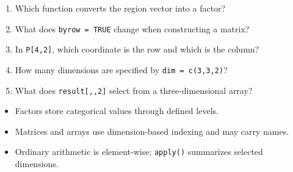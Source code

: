 \begin{quickcheck}
\begin{enumerate}
  \item Which function converts the region vector into a factor?
  \item What does \texttt{byrow = TRUE} change when constructing a matrix?
  \item In \texttt{P[4,2]}, which coordinate is the row and which is the column?
  \item How many dimensions are specified by \texttt{dim = c(3,3,2)}?
  \item What does \texttt{result[,,2]} select from a three-dimensional array?
\end{enumerate}
\end{quickcheck}

\begin{chapterrecap}
\begin{itemize}
  \item Factors store categorical values through defined levels.
  \item Matrices and arrays use dimension-based indexing and may carry names.
  \item Ordinary arithmetic is element-wise; \texttt{apply()} summarizes selected dimensions.
\end{itemize}
\end{chapterrecap}
